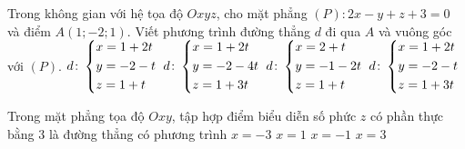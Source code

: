 \begin{ex}%
Trong không gian với hệ tọa độ $Oxyz$, cho mặt phẳng $(P)\colon 2x-y+z+3=0$ và điểm $A(1;-2;1)$. Viết phương trình đường thẳng $d$ đi qua $A$ và vuông góc với $(P)$.
\choice
{\True $d\colon  \left\{\begin{aligned}&x=1+2t\\&y=-2-t\\&z=1+t\end{aligned}\right.$}
{$d\colon  \left\{\begin{aligned}&x=1+2t\\&y=-2-4t\\&z=1+3t\end{aligned}\right.$}
{$d\colon  \left\{\begin{aligned}&x=2+t\\&y=-1-2t\\&z=1+t\end{aligned}\right.$}
{$d\colon  \left\{\begin{aligned}&x=1+2t\\&y=-2-t\\&z=1+3t\end{aligned}\right.$}
\end{ex}

\begin{ex}%
Trong mặt phẳng tọa độ $Oxy$, tập hợp điểm biểu diễn số phức $z$ có phần thực bằng $3$ là đường thẳng có phương trình
\choice
{$x=-3$}
{$x=1$}
{$x=-1$}
{\True $x=3$}
\end{ex}

